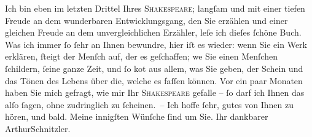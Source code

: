 \pstart
           Ich \introOben{}bin\introOben{} eben im letzten Drittel Ihres \textsc{Shakespeare}; langſam und mit einer tiefen Freude an dem wunderbaren {\pb}Entwicklungsgang, den Sie erzählen und einer
               gleichen Freude an dem unvergleichlichen Erzähler, leſe ich dieſes{ }ſchöne Buch. Was
               ich immer{ }ſo{ }ſehr an Ihnen bewundre, hier iſt es wieder: wenn Sie ein Werk erklären,{ }ſteigt der Menſch auf, der es geſchaffen; we{\geminationn} Sie einen
               Menſchen{ }ſchildern,{ }ſeine ganze Zeit, und {\pb}ſo ko{\geminationm}t aus allem, was
               Sie geben, der Schein und das Tönen des Lebens über die, welche es faſſen können. Vor
               ein paar Monaten haben Sie mich gefragt, wie mir Ihr \textsc{Shakespeare} gefalle –{ }ſo darf ich Ihnen das alſo{ }ſagen, ohne zudringlich zu{ }ſcheinen. –\pend
           \pstart Ich hoffe{ }ſehr, gutes von Ihnen zu hören, und bald. Meine innigſten Wünſche{ }ſind
               um Sie. Ihr dankbarer \spacefill\mbox{ArthurSchnitzler.}\pend{}\endnumbering{}  \newcommand{\dateiname}{L00696}\newcommand{\titel}{Arthur Schnitzler an Georg Brandes, 9. 7. 1897}\newcommand{\editorInnen}{Martin Anton Müller und Gerd-Hermann Susen}
